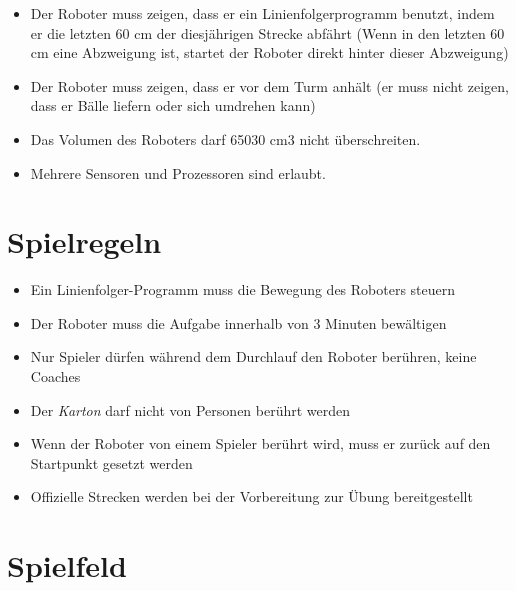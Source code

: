 \documentclass[a4paper,12pt]{article}
\begin{document}
\begin{itemize}
	\item Der Roboter muss zeigen, dass er ein Linienfolgerprogramm benutzt, indem er die letzten 60 cm der
	diesjährigen Strecke abfährt (Wenn in den letzten 60 cm eine Abzweigung ist, startet der Roboter direkt hinter
	dieser Abzweigung)
	\item Der Roboter muss zeigen, dass er vor dem Turm anhält (er muss nicht zeigen, dass er Bälle liefern oder sich
	umdrehen kann)
	\item Das Volumen des Roboters darf 65030 cm3 nicht überschreiten.
	\item Mehrere Sensoren und Prozessoren sind erlaubt.
\end{itemize}
\section{Spielregeln}
\begin{itemize}
	\item Ein Linienfolger-Programm muss die Bewegung des Roboters steuern
	\item Der Roboter muss die Aufgabe innerhalb von 3 Minuten bewältigen
	\item Nur Spieler dürfen während dem Durchlauf den Roboter berühren, keine Coaches
	\item Der \emph{Karton} darf nicht von Personen berührt werden
	\item Wenn der Roboter von einem Spieler berührt wird, muss er zurück auf den Startpunkt gesetzt werden
	\item Offizielle Strecken werden bei der Vorbereitung zur Übung bereitgestellt
\end{itemize}
\section{Spielfeld}
\end{document}
